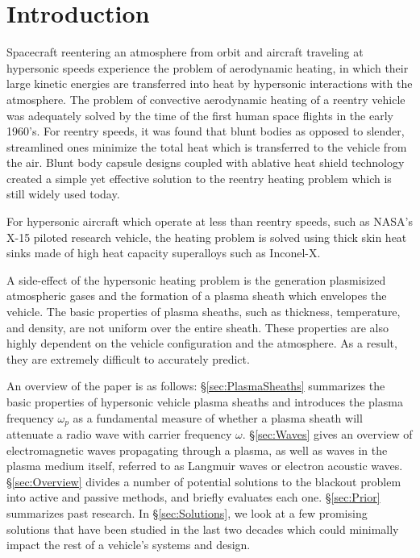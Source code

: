 \documentclass[twocolumn]{article}
\begin{document}
\section{Introduction}
	Spacecraft reentering an atmosphere from orbit and aircraft traveling at hypersonic speeds experience the problem of aerodynamic heating, in which their large kinetic energies are transferred into heat by hypersonic interactions with the atmosphere.
	The problem of convective aerodynamic heating of a reentry vehicle was adequately solved by the time of the first human space flights in the early 1960's.
	For reentry speeds, it was found that blunt bodies as opposed to slender, streamlined ones minimize the total heat which is transferred to the vehicle from the air.\cite{allen_study_1958}
	Blunt body capsule designs coupled with ablative heat shield technology created a simple yet effective solution to the reentry heating problem which is still widely used today.
	
	For hypersonic aircraft which operate at less than reentry speeds, such as NASA's X-15 piloted research vehicle, the heating problem is solved using thick skin heat sinks made of high heat capacity superalloys such as Inconel-X.\cite{stillwell_x-15_1965}
	
	A side-effect of the hypersonic heating problem is the generation plasmisized atmospheric gases and the formation of a plasma sheath which envelopes the vehicle.
	The basic properties of plasma sheaths, such as thickness, temperature, and density, are not uniform over the entire sheath. 
	These properties are also highly dependent on the vehicle configuration and the atmosphere.
	As a result, they are extremely difficult to accurately predict.
	
	An overview of the paper is as follows: \S\ref{sec:PlasmaSheaths} summarizes the basic properties of hypersonic vehicle plasma sheaths and introduces the plasma frequency $\omega_p$ as a fundamental measure of whether a plasma sheath will attenuate a radio wave with carrier frequency $\omega$.
	\S\ref{sec:Waves} gives an overview of electromagnetic waves propagating through a plasma, as well as waves in the plasma medium itself, referred to as Langmuir waves or electron acoustic waves.
	\S\ref{sec:Overview} divides a number of potential solutions to the blackout problem into active and passive methods, and briefly evaluates each one.
	\S\ref{sec:Prior} summarizes past research.
	In \S\ref{sec:Solutions}, we look at a few promising solutions that have been studied in the last two decades which could minimally impact the rest of a vehicle's systems and design.
	
\end{document}

